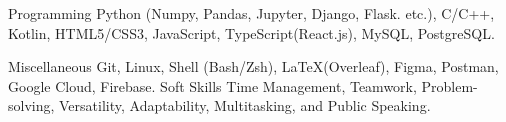 

\begin{cvskills}

  \cvskill
    {Programming} %
    {Python (Numpy, Pandas, Jupyter, Django, Flask. etc.), C/C++, Kotlin, HTML5/CSS3, JavaScript, TypeScript(React.js), MySQL, PostgreSQL.} %

  \cvskill
    {Miscellaneous} %
    {Git, Linux, Shell (Bash/Zsh), \LaTeX (Overleaf), Figma, Postman, Google Cloud, Firebase.} %
  \cvskill
    {Soft Skills} %
    {Time Management, Teamwork, Problem-solving, Versatility,  Adaptability, Multitasking, and Public Speaking.} %

\end{cvskills}
